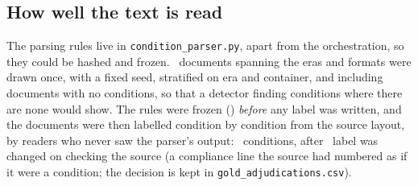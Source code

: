 \documentclass[11pt]{article}
\newcommand{\cctable}[1]{\FloatBarrier\def\cctab{#1}}
\begin{document}
\cctable{mention}

\subsection{How well the text is read}
\label{sec:validation}

The parsing rules live in \texttt{condition\_parser.py}, apart from the orchestration, so they
could be hashed and frozen. \ccGoldN\ documents spanning the eras and formats were drawn once,
with a fixed seed, stratified on era and container, and including documents with no conditions,
so that a detector finding conditions where there are none would show. The rules were frozen
(\ccValRoneFrozen) \emph{before} any label was written, and the documents were then labelled
condition by condition from the source layout, by readers who never saw the parser's output:
\ccValGoldConds\ conditions, after \ccValAdjudicated\ label was changed on checking the source
(a compliance line the source had numbered as if it were a condition; the decision is kept in
\texttt{gold\_adjudications.csv}).
\end{document}
